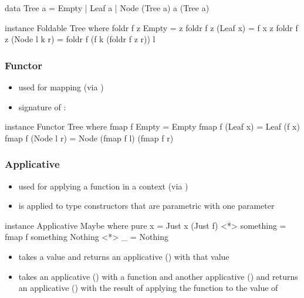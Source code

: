 \documentclass[a4paper,landscape,10pt]{article}
\begin{document}
\begin{multicols*}{2}
  \begin{haskell}
data Tree a = Empty | Leaf a | Node (Tree a) a (Tree a)

instance Foldable Tree where
  foldr f z Empty = z
  foldr f z (Leaf x) = f x z
  foldr f z (Node l k r) = foldr f (f k (foldr f z r)) l
\end{haskell}

  \subsubsection{Functor}

  \begin{itemize}
    \item used for mapping (via )
    \item signature of : 
  \end{itemize}

  \begin{haskell}
instance Functor Tree where
  fmap f Empty = Empty
  fmap f (Leaf x) = Leaf (f x)
  fmap f (Node l r) = Node (fmap f l) (fmap f r)
\end{haskell}

  \breakcolumn

  \subsubsection{Applicative}

  \begin{itemize}
    \item used for applying a function in a context (via \ihaskell{<*>})
    \item is applied to type constructors that are parametric with one parameter
  \end{itemize}

  \begin{haskell}
instance Applicative Maybe where
  pure x = Just x
  (Just f) <*> something = fmap f something
  Nothing <*> _ = Nothing
\end{haskell}

  \begin{itemize}
    \item {} takes a value and returns an applicative () with that value
    \item \ihaskell{<*>} takes an applicative () with a function and another applicative () and returns an applicative () with the result of applying the function to the value of 
  \end{itemize}


\end{multicols*}
\end{document}
